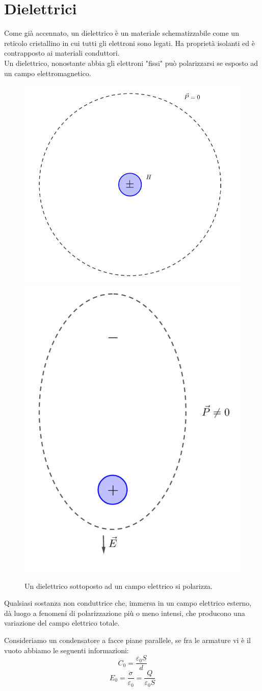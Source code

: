 \documentclass[
10pt, %
a4paper, %
oneside, %
headinclude,footinclude, %
BCOR5mm, %
]{scrartcl}
\begin{document}
\section{Dielettrici}
Come già accennato, un dielettrico è un materiale schematizzabile come un reticolo cristallino in cui tutti gli elettroni sono legati. Ha proprietà isolanti ed è contrapposto ai materiali conduttori.\\
Un dielettrico, nonostante abbia gli elettroni "fissi" può polarizzarsi se esposto ad un campo elettromagnetico.
\begin{figure}[h!]
	\centering
	\includegraphics[width=0.4\linewidth]{../images/dielettrico_idrogeno_1}\quad
	\includegraphics[width=0.4\linewidth]{../images/dielettrico_idrogeno_2}
	\caption{Un dielettrico sottoposto ad un campo elettrico si polarizza.}
	\label{fig:dielettricoidrogeno}
\end{figure}
\FloatBarrier
\begin{definizione}[Dielettrico]
	Qualsiasi sostanza non conduttrice che, immersa in un campo elettrico esterno, dà luogo a fenomeni di polarizzazione più o meno intensi, che producono una variazione del campo elettrico totale.
\end{definizione}
Consideriamo un condensatore a facce piane parallele, se fra le armature vi è il vuoto abbiamo le seguenti informazioni:
\[C_0 = \frac{\varepsilon_0S}{d}\]
\[E_0 = \frac{\sigma}{\varepsilon_0} = \frac{Q}{\varepsilon_0 S}\]
\end{document}
